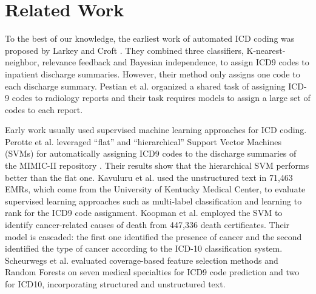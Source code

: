 \documentclass[letterpaper]{article} \usepackage{aaai20}  \usepackage{times}  \usepackage{helvet} \usepackage{courier}  \usepackage[hyphens]{url}  \usepackage{graphicx} \urlstyle{rm} \def\UrlFont{\rm}  \usepackage{graphicx}  \frenchspacing  \setlength{\pdfpagewidth}{8.5in}  \setlength{\pdfpageheight}{11in}
\begin{document}
\section{Related Work}

To the best of our knowledge, the earliest work of automated ICD coding was proposed by Larkey and Croft . They combined three classifiers, K-nearest-neighbor, relevance feedback and Bayesian independence, to assign ICD9 codes to inpatient discharge summaries. However, their method only assigns one code to each discharge summary. Pestian et al.  organized a shared task of assigning ICD-9 codes to radiology reports and their task requires models to assign a large set of codes to each report.

Early work usually used supervised machine learning approaches for ICD coding. Perotte et al.  leveraged ``flat'' and ``hierarchical'' Support Vector Machines (SVMs) for automatically assigning ICD9 codes to the discharge summaries of the MIMIC-II repository \cite{johnson2016mimic}. Their results show that the hierarchical SVM performs better than the flat one. Kavuluru et al.  used the unstructured text in 71,463 EMRs, which come from the University of Kentucky Medical Center, to evaluate supervised learning approaches such as multi-label classification and learning to rank for the ICD9 code assignment. Koopman et al.  employed the SVM to identify cancer-related causes of death
from 447,336 death certificates. Their model is cascaded: the first one identified the presence of cancer and the second identified the type of cancer according to the ICD-10 classification system. Scheurwegs et al.  evaluated coverage-based feature selection methods and Random
Forests on seven medical specialties for ICD9 code prediction and two for ICD10, incorporating structured and unstructured text.
\end{document}
